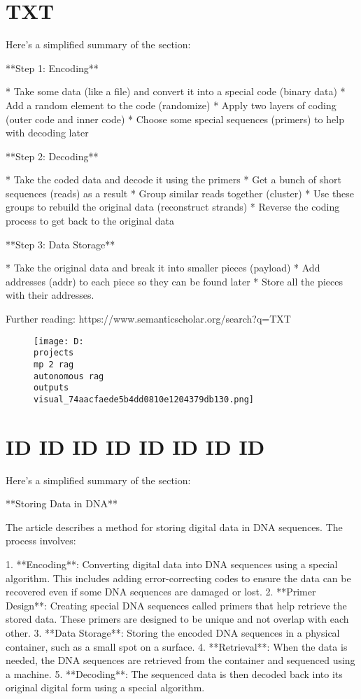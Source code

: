 \documentclass[12pt,a4paper]{article}
\begin{document}
\section{TXT}
Here's a simplified summary of the section:

**Step 1: Encoding**

* Take some data (like a file) and convert it into a special code (binary data)
* Add a random element to the code (randomize)
* Apply two layers of coding (outer code and inner code)
* Choose some special sequences (primers) to help with decoding later

**Step 2: Decoding**

* Take the coded data and decode it using the primers
* Get a bunch of short sequences (reads) as a result
* Group similar reads together (cluster)
* Use these groups to rebuild the original data (reconstruct strands)
* Reverse the coding process to get back to the original data

**Step 3: Data Storage**

* Take the original data and break it into smaller pieces (payload)
* Add addresses (addr) to each piece so they can be found later
* Store all the pieces with their addresses.

Further reading: https://www.semanticscholar.org/search?q=TXT
\begin{figure}[h]
\centering
\texttt{[image: D:\\projects\\mp 2 rag\\autonomous rag\\outputs\\visual\_74aacfaede5b4dd0810e1204379db130.png]}
\end{figure}
\section{ID
ID
ID
ID
ID
ID
ID
ID}
Here's a simplified summary of the section:

**Storing Data in DNA**

The article describes a method for storing digital data in DNA sequences. The process involves:

1. **Encoding**: Converting digital data into DNA sequences using a special algorithm. This includes adding error-correcting codes to ensure the data can be recovered even if some DNA sequences are damaged or lost.
2. **Primer Design**: Creating special DNA sequences called primers that help retrieve the stored data. These primers are designed to be unique and not overlap with each other.
3. **Data Storage**: Storing the encoded DNA sequences in a physical container, such as a small spot on a surface.
4. **Retrieval**: When the data is needed, the DNA sequences are retrieved from the container and sequenced using a machine.
5. **Decoding**: The sequenced data is then decoded back into its original digital form using a special algorithm.
\end{document}
